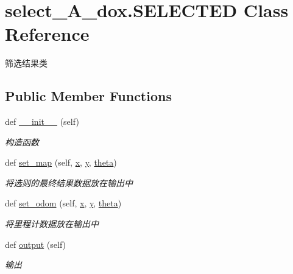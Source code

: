 \hypertarget{classselect___a__dox_1_1_s_e_l_e_c_t_e_d}{}\section{select\+\_\+\+A\+\_\+dox.\+S\+E\+L\+E\+C\+T\+ED Class Reference}
\label{classselect___a__dox_1_1_s_e_l_e_c_t_e_d}


筛选结果类  


\subsection*{Public Member Functions}
\begin{DoxyCompactItemize}
\item 
def \hyperlink{classselect___a__dox_1_1_s_e_l_e_c_t_e_d_a90a6a0bd0f87fef2dbd12104f7eb2020}{\+\_\+\+\_\+init\+\_\+\+\_\+} (self)
\begin{DoxyCompactList}\small\item\em 构造函数 \end{DoxyCompactList}\item 
def \hyperlink{classselect___a__dox_1_1_s_e_l_e_c_t_e_d_a5ecef7f1fa601e80a826e5247a77d6cd}{set\+\_\+map} (self, \hyperlink{classselect___a__dox_1_1_s_e_l_e_c_t_e_d_a1c4ae522090af97ba4acbec134623509}{x}, \hyperlink{classselect___a__dox_1_1_s_e_l_e_c_t_e_d_a91bd3c9d4a954d1881223ced9b05ee80}{y}, \hyperlink{classselect___a__dox_1_1_s_e_l_e_c_t_e_d_a3399081a104b91dbb6fa59816e56e822}{theta})
\begin{DoxyCompactList}\small\item\em 将选则的最终结果数据放在输出中 \end{DoxyCompactList}\item 
def \hyperlink{classselect___a__dox_1_1_s_e_l_e_c_t_e_d_a996f8d2a606054a06cf2b9ab55ec92e1}{set\+\_\+odom} (self, \hyperlink{classselect___a__dox_1_1_s_e_l_e_c_t_e_d_a1c4ae522090af97ba4acbec134623509}{x}, \hyperlink{classselect___a__dox_1_1_s_e_l_e_c_t_e_d_a91bd3c9d4a954d1881223ced9b05ee80}{y}, \hyperlink{classselect___a__dox_1_1_s_e_l_e_c_t_e_d_a3399081a104b91dbb6fa59816e56e822}{theta})
\begin{DoxyCompactList}\small\item\em 将里程计数据放在输出中 \end{DoxyCompactList}\item 
def \hyperlink{classselect___a__dox_1_1_s_e_l_e_c_t_e_d_ab38818097e9b5b4e0abd2d2763931ac0}{output} (self)
\begin{DoxyCompactList}\small\item\em 输出 \end{DoxyCompactList}\end{DoxyCompactItemize}

